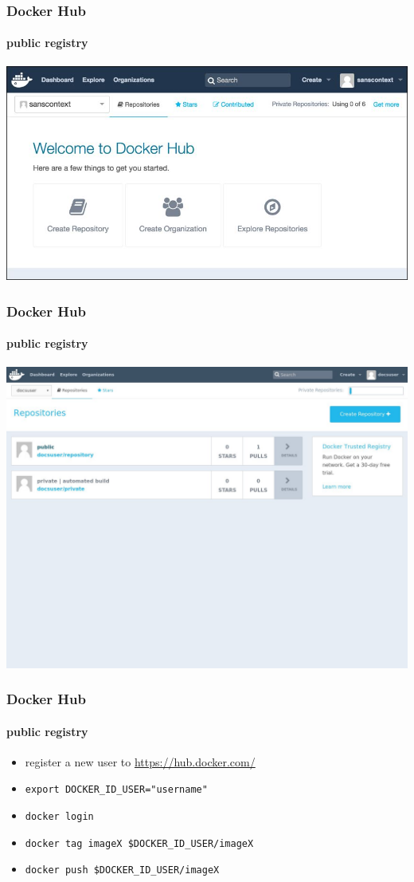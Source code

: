 \begin{frame}[fragile]
\frametitle{Docker Hub}
\framesubtitle{public registry}

\includegraphics[width=0.8\columnwidth]{./Figure/docker-222-114}
\end{frame}


\begin{frame}[fragile]
\frametitle{Docker Hub}
\framesubtitle{public registry}

\includegraphics[width=0.8\columnwidth]{./Figure/docker-223-116}
\end{frame}

\begin{frame}[fragile]
\frametitle{Docker Hub}
\framesubtitle{public registry}
\begin{itemize}
\item register a new user to \url{https://hub.docker.com/}
\item \lstinline!export DOCKER_ID_USER="username"!
\item \lstinline!docker login!
\item \lstinline!docker tag imageX $DOCKER_ID_USER/imageX!
\item \lstinline!docker push $DOCKER_ID_USER/imageX!
\end{itemize}
\end{frame}